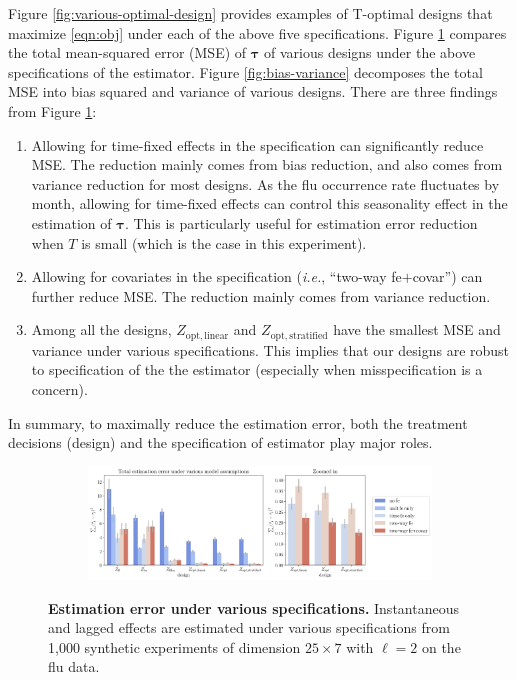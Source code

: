 Figure \ref{fig:various-optimal-design} provides examples of T-optimal designs that maximize \eqref{eqn:obj} under each of the above five specifications. Figure \ref{fig:various-estimation-method} compares the total mean-squared error (MSE) of $\bm{\tau}$ of various designs under the above specifications of the estimator. Figure \ref{fig:bias-variance} decomposes the total MSE into bias squared and variance of various designs. There are three findings from Figure \ref{fig:various-estimation-method}:
%
\begin{enumerate}
    \item Allowing for time-fixed effects in the specification can significantly reduce MSE. The reduction mainly comes from bias reduction, and also comes from variance reduction for most designs. As the flu occurrence rate fluctuates by month, allowing for time-fixed effects can control this seasonality effect in the estimation of $\bm{\tau}$. This is particularly useful for estimation error reduction when $T$ is small (which is the case in this experiment).
    \item Allowing for covariates in the specification ({\it i.e.}, ``two-way fe$+$covar'') can further reduce MSE. The reduction mainly comes from variance reduction. 
    \item 
    Among all the designs, $Z_{\mathrm{opt,linear}}$ and $Z_{\mathrm{opt,stratified}}$ have the smallest MSE and variance under various specifications. This implies that our designs are robust to specification of the the estimator (especially when misspecification is a concern).
\end{enumerate}
%
In summary, to maximally reduce the estimation error, both the treatment decisions (design) and the specification of estimator play major roles.

\begin{figure}[H]
	\centering
	\begin{subfigure}{.95\textwidth}
		\centering
		\includegraphics[width=1\linewidth]{plots/empirical/flu/nonadaptive/flu_N_25_T_7_various_methods-full.pdf}
	\end{subfigure}
	\caption{\textbf{Estimation error under various specifications.} Instantaneous and lagged effects are estimated under various specifications from 1,000 synthetic experiments of dimension $25\times 7$ with $\ell = 2$ on the flu data. }
	\label{fig:various-estimation-method}
\end{figure}


